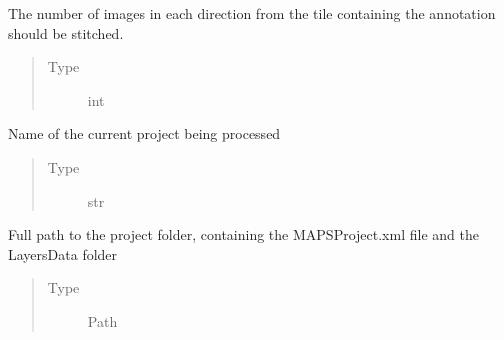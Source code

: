 \documentclass[letterpaper,10pt,english]{sphinxmanual}
\begin{document}
\begin{fulllineitems}
\begin{quote}
\begin{description}
\begin{itemize}
\end{itemize}

\end{description}\end{quote}

\begin{fulllineitems}
\label{\detokenize{index:stitch_MAPS_annotations.Stitcher.stitch_radius}}
The number of images in each direction from the tile containing the annotation should be
stitched.
\begin{quote}\begin{description}
\item[{Type}] \leavevmode
int

\end{description}\end{quote}

\end{fulllineitems}


\begin{fulllineitems}
\label{\detokenize{index:stitch_MAPS_annotations.Stitcher.project_name}}
Name of the current project being processed
\begin{quote}\begin{description}
\item[{Type}] \leavevmode
str

\end{description}\end{quote}

\end{fulllineitems}


\begin{fulllineitems}
\label{\detokenize{index:stitch_MAPS_annotations.Stitcher.project_folder_path}}
Full path to the project folder, containing the MAPSProject.xml file and the
LayersData folder
\begin{quote}\begin{description}
\item[{Type}] \leavevmode
Path


\end{description}
\end{quote}
\end{fulllineitems}
\end{fulllineitems}
\end{document}
